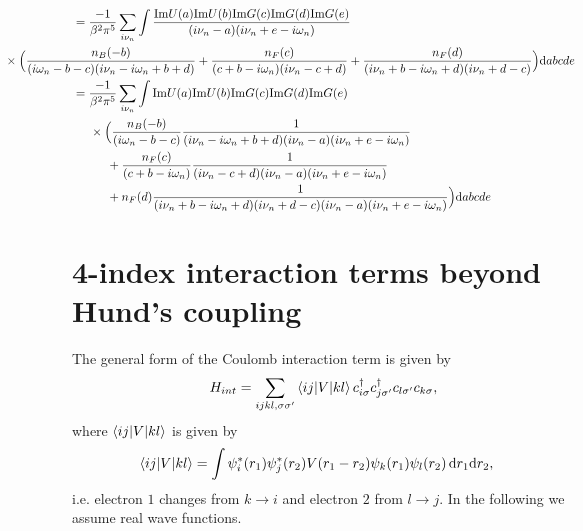 \documentclass[12pt,a4paper]{scrartcl}
\numberwithin{equation}{section}
\begin{document}
\begin{align}
 &= \frac{-1}{\beta^2\pi^5}\sum_{i\nu_n} 
       \int \frac{ \mathrm{Im}U(a)\mathrm{Im}U(b)\mathrm{Im}G(c)\mathrm{Im}G(d)\mathrm{Im}G(e) }
                 { (i\nu_n-a)(i\nu_n+e-i\omega_n) } \nonumber \\
&\hspace*{-2cm}  \times\Big( 
                    \frac{n_B(-b)}{(i\omega_n-b-c)(i\nu_n-i\omega_n+b+d)}
                   +\frac{n_F(c)}{(c+b-i\omega_n)(i\nu_n-c+d)} 
                   +\frac{n_F(d)}{(i\nu_n+b-i\omega_n+d)(i\nu_n+d-c)}
                 \Big)\mathrm{d}abcde \\
%
 &= \frac{-1}{\beta^2\pi^5}\sum_{i\nu_n} 
       \int \mathrm{Im}U(a)\mathrm{Im}U(b)\mathrm{Im}G(c)\mathrm{Im}G(d)\mathrm{Im}G(e) \nonumber \\
&\hspace*{0.5cm}  \times\Big( 
                    \frac{n_B(-b)}{(i\omega_n-b-c)}
                    \frac{1}{(i\nu_n-i\omega_n+b+d)(i\nu_n-a)(i\nu_n+e-i\omega_n)}\nonumber \\
&\hspace*{1cm} 
                   +\frac{n_F(c)}{(c+b-i\omega_n)} 
                   \frac{1}{(i\nu_n-c+d)(i\nu_n-a)(i\nu_n+e-i\omega_n)}\nonumber \\
&\hspace*{1cm} 
                   +n_F(d)
                   \frac{1}{(i\nu_n+b-i\omega_n+d)(i\nu_n+d-c)(i\nu_n-a)(i\nu_n+e-i\omega_n)}
                 \Big)\mathrm{d}abcde
\end{align}

\clearpage


\section{4-index interaction terms beyond Hund's coupling}
The general form of the Coulomb interaction term is given by
\begin{align}
 H_{int} = \sum_{ijkl,\sigma\sigma'} \braket{ij|V|kl} c^{\dagger}_{i\sigma} c^{\dagger}_{j\sigma'} c_{l\sigma'} c_{k\sigma},
\end{align}
where $\braket{ij|V|kl}$ is given by
\begin{align}
 \braket{ij|V|kl}
 &= \int \psi^*_i(r_1) \psi^*_j(r_2) V(r_1-r_2) \psi_k(r_1) \psi_l(r_2) \, \mathrm{d}r_1\mathrm{d}r_2,
\end{align}
i.e. electron $1$ changes from $k\rightarrow i$ and electron $2$ from $l\rightarrow j$.
In the following we assume real wave functions.
\end{document}
